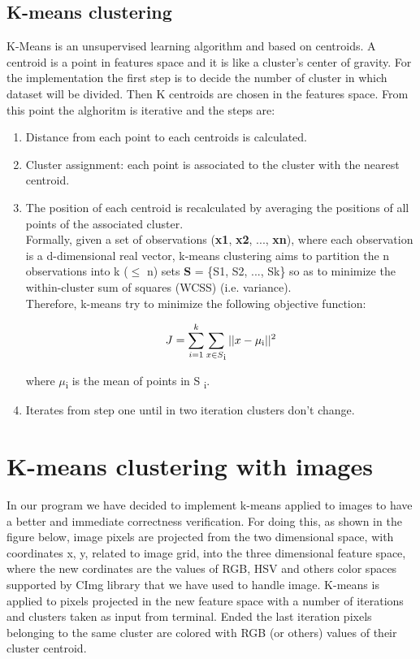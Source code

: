 \documentclass[10pt,twocolumn,letterpaper]{article}
\begin{document}
\subsection{K-means clustering}

K-Means is an unsupervised learning algorithm and based on centroids. A centroid is a point in features space and it is like a cluster's center of gravity.
For the implementation the first step is to decide the number of cluster in which dataset will be divided. Then K centroids are chosen in the features space. From this point the alghoritm is iterative and the steps are:
\begin{enumerate}
    \item Distance from each point to each centroids is calculated.
    \item Cluster assignment: each point is associated to the cluster with the nearest centroid.
    \item The position of each centroid is recalculated by averaging the positions of all points of the associated cluster.\\
    Formally, given a set of observations (\textbf{x1}, \textbf{x2}, ..., \textbf{xn}), where each observation is a d-dimensional real vector, k-means clustering aims to partition the n observations into k ($\leq$ n) sets \textbf{S} = \{S1, S2, ..., Sk\} so as to minimize the within-cluster sum of squares (WCSS) (i.e. variance).\\
    Therefore, k-means try to minimize the following objective function:

\[J = \sum_{i=1}^k \sum_{x\in S\textsubscript i} || x - \mu \textsubscript i||\textsuperscript 2\]

where $\mu $\textsubscript{i} is the mean of points in S \textsubscript i.

    \item Iterates from step one until in two iteration clusters don't change.
\end{enumerate}

\section{K-means clustering with images}

In our program we have decided to implement k-means applied to images to have a better and immediate correctness verification. For doing this, as shown in the figure below, image pixels are projected from the two dimensional space, with coordinates x, y, related to image grid, into the three dimensional feature space, where the new cordinates are the values of RGB, HSV and others color spaces supported by CImg library that we have used to handle image. K-means is applied to pixels projected in the new feature space with a number of iterations and clusters taken as input from terminal. Ended the last iteration pixels belonging to the same cluster are colored with RGB (or others) values of their cluster centroid.
\end{document}
